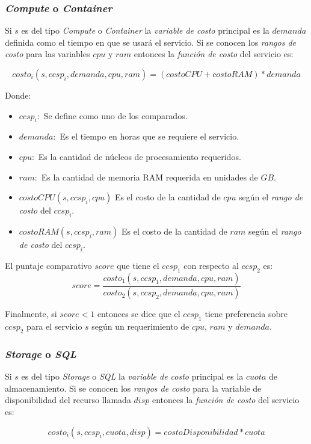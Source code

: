 \subsubsection{\emph{Compute} o \emph{Container}}
Si $s$ es del tipo \emph{Compute} o \emph{Container} la \emph{variable de costo} principal es la $demanda$ definida como el tiempo en que se usará el servicio. Si se conocen los \emph{rangos de costo} para las variables $cpu$ y $ram$ entonces la \emph{función de costo} del servicio es:

\[ costo_i(s,ccsp_i, demanda, cpu, ram) = (costoCPU +costoRAM)*demanda \]

Donde:
\begin{itemize}
    \item $ccsp_i:$ Se define como uno de los  comparados.
    \item $demanda:$ Es el tiempo en horas que se requiere el servicio.
    \item $cpu:$ Es la cantidad de núcleos de procesamiento requeridos.
    \item $ram:$ Es la cantidad de memoria RAM requerida en unidades de $GB$.
    \item $costoCPU(s,ccsp_i, cpu)$ Es el costo de la cantidad de $cpu$ según el \emph{rango de costo} del $ccsp_i$.
    \item $costoRAM(s,ccsp_i, ram)$ Es el costo de la cantidad de $ram$ según el \emph{rango de costo} del $ccsp_i$.
\end{itemize}

El puntaje comparativo $score$ que tiene el $ccsp_1$ con respecto al $ccsp_2$ es:
\[ score = \frac{costo_1(s,ccsp_1,demanda,cpu,ram)}{costo_2(s,ccsp_2,demanda,cpu,ram)} \]

Finalmente, si $score < 1$ entonces se dice que el $ccsp_1$ tiene preferencia sobre $ccsp_2$ para el servicio $s$ según un requerimiento de $cpu$, $ram$ y $demanda$.

\subsubsection{\emph{Storage} o \emph{SQL}}
Si $s$ es del tipo \emph{Storage} o \emph{SQL} la \emph{variable de costo} principal es la $cuota$ de almacenamiento. Si se conocen los \emph{rangos de costo} para la variable de disponibilidad del recurso llamada $disp$ entonces la \emph{función de costo} del servicio es:

\[ costo_i(s,ccsp_i, cuota, disp) = costoDisponibilidad*cuota \]

